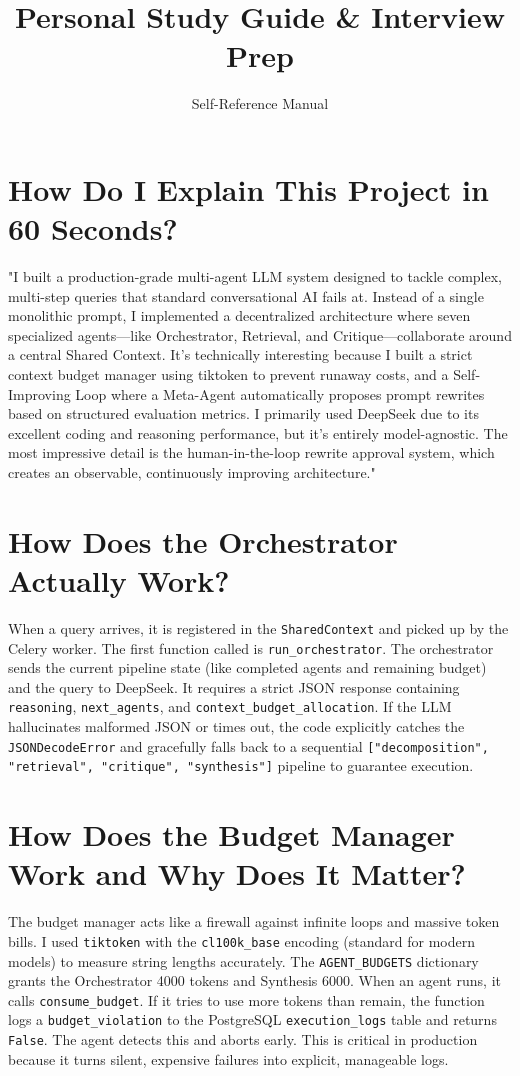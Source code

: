 \documentclass[11pt]{article}
\title{Personal Study Guide \& Interview Prep}
\author{Self-Reference Manual}
\date{}
\begin{document}
\maketitle

\section{How Do I Explain This Project in 60 Seconds?}
"I built a production-grade multi-agent LLM system designed to tackle complex, multi-step queries that standard conversational AI fails at. Instead of a single monolithic prompt, I implemented a decentralized architecture where seven specialized agents—like Orchestrator, Retrieval, and Critique—collaborate around a central Shared Context. It's technically interesting because I built a strict context budget manager using tiktoken to prevent runaway costs, and a Self-Improving Loop where a Meta-Agent automatically proposes prompt rewrites based on structured evaluation metrics. I primarily used DeepSeek due to its excellent coding and reasoning performance, but it's entirely model-agnostic. The most impressive detail is the human-in-the-loop rewrite approval system, which creates an observable, continuously improving architecture."

\section{How Does the Orchestrator Actually Work?}
When a query arrives, it is registered in the \texttt{SharedContext} and picked up by the Celery worker. The first function called is \texttt{run\_orchestrator}. The orchestrator sends the current pipeline state (like completed agents and remaining budget) and the query to DeepSeek. It requires a strict JSON response containing \texttt{reasoning}, \texttt{next\_agents}, and \texttt{context\_budget\_allocation}. If the LLM hallucinates malformed JSON or times out, the code explicitly catches the \texttt{JSONDecodeError} and gracefully falls back to a sequential \texttt{["decomposition", "retrieval", "critique", "synthesis"]} pipeline to guarantee execution.

\section{How Does the Budget Manager Work and Why Does It Matter?}
The budget manager acts like a firewall against infinite loops and massive token bills. I used \texttt{tiktoken} with the \texttt{cl100k\_base} encoding (standard for modern models) to measure string lengths accurately. The \texttt{AGENT\_BUDGETS} dictionary grants the Orchestrator 4000 tokens and Synthesis 6000. When an agent runs, it calls \texttt{consume\_budget}. If it tries to use more tokens than remain, the function logs a \texttt{budget\_violation} to the PostgreSQL \texttt{execution\_logs} table and returns \texttt{False}. The agent detects this and aborts early. This is critical in production because it turns silent, expensive failures into explicit, manageable logs.
\end{document}
